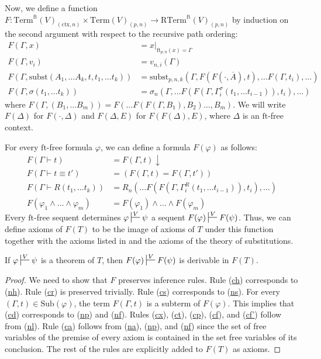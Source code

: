 \documentclass[reqno]{amsart}
\newcommand{\axref}[1]{(\hyperref[ax:#1]{#1})}
\theoremstyle{definition}
\theoremstyle{remark}
\newcommand{\fs}[1]{\mathrm{#1}}
\newcommand{\Term}{\fs{Term}}
\newcommand{\RTerm}{\fs{RTerm}}
\newcommand{\subst}{\fs{subst}}
\newcommand{\ft}{\fs{ft}}
\newcommand{\ctx}{\fs{ctx}}
\newcommand{\sub}{\fs{Sub}}
\numberwithin{figure}{section}
\begin{document}
Now, we define a function $F : \Term^\ft(V)_{(\ctx,n)} \times \Term(V)_{(p,n)} \to \RTerm^\ft(V)_{(p,n)}$ by induction on the second argument with respect to the recursive path ordering:
\begin{align*}
F(\Gamma, x) & = x|_{\ft_{p,n}(x) = \Gamma} \\
F(\Gamma, v_i) & = v_{n,i}(\Gamma) \\
F(\Gamma, \subst(A_1, \ldots A_k, t, t_1, \ldots t_k)) & = \subst_{p,n,k}(\Gamma, F(F(\cdot,\overline{A}), t), \ldots F(\Gamma, t_i), \ldots) \\
F(\Gamma, \sigma(t_1, \ldots t_k)) & = \sigma_n(\Gamma, \ldots F(F(\Gamma, \Gamma^\sigma_i(t_1, \ldots t_{i-1})), t_i), \ldots)
\end{align*}
where $F(\Gamma, (B_1, \ldots B_m)) = F(\ldots F(F(\Gamma, B_1), B_2) \ldots, B_m)$.
We will write $F(\Delta)$ for $F(\cdot,\Delta)$ and $F(\Delta,E)$ for $F(F(\Delta),E)$, where $\Delta$ is an $\ft$-free context.

For every $\ft$-free formula $\varphi$, we can define a formula $F(\varphi)$ as follows:
\begin{align*}
F(\Gamma \vdash t) & = F(\Gamma,t)\!\downarrow \\
F(\Gamma \vdash t \equiv t') & = (F(\Gamma,t) = F(\Gamma,t')) \\
F(\Gamma \vdash R(t_1, \ldots t_k)) & = R_n(\ldots F(F(\Gamma, \Gamma^R_i(t_1, \ldots t_{i-1})), t_i), \ldots) \\
F(\varphi_1 \land \ldots \land \varphi_m) & = F(\varphi_1) \land \ldots \land F(\varphi_m)
\end{align*}
Every $\ft$-free sequent determines $\varphi \sststile{}{V} \psi$ a sequent $F(\varphi) \sststile{}{V} F(\psi)$.
Thus, we can define axioms of $F(T)$ to be the image of axioms of $T$ under this function together with the axioms listed in  and the axioms of the theory of substitutions.

\begin{lem}[ftmap-th]
If $\varphi \sststile{}{V} \psi$ is a theorem of $T$, then $F(\varphi) \sststile{}{V} F(\psi)$ is derivable in $F(T)$.
\end{lem}
\begin{proof}
We need to show that $F$ preserves inference rules.
Rule \axref{ch} corresponds to \axref{nh}.
Rule \axref{cr} is preserved trivially.
Rule \axref{cs} corresponds to \axref{ns}.
For every $(\Gamma,t) \in \sub(\varphi)$, the term $F(\Gamma,t)$ is a subterm of $F(\varphi)$.
This implies that \axref{cd} corresponds to \axref{np} and \axref{nf}.
Rules \axref{cx}, \axref{ct}, \axref{cp}, \axref{cf}, and \axref{cf'} follow from \axref{nl}.
Rule \axref{ca} follows from \axref{na}, \axref{np}, and \axref{nf} since the set of free variables of the premise of every axiom is contained in the set free variables of its conclusion.
The rest of the rules are explicitly added to $F(T)$ as axioms.
\end{proof}
\end{document}
